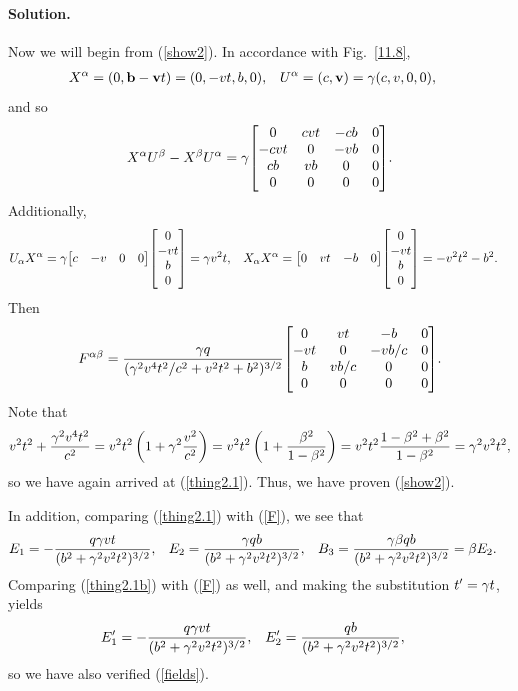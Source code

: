 \documentclass[11pt]{article}
\newcommand{\refeq}[1]{(\ref{#1})}
\newcommand{\beq}{\begin{equation*}}
\newcommand{\eeq}{\end{equation*}}
\newenvironment{solution}
{
	\paragraph{Solution.}
	\ignorespaces
}
{
    \bigskip
}
\begin{document}
\begin{solution}
	Now we will begin from \refeq{show2}.  In accordance with Fig.~\ref{11.8},
	\begin{align*}
		X^\alpha &= (0, \vb{b} - \vb{v} t) = (0, -v t, b, 0), &
		U^\alpha &= (c, \vb{v}) = \gamma (c, v, 0, 0),
	\end{align*}
	and so
	\beq
		\Xa \Ub - \Xb \Ua = \gam \mqty[	0 & c v t & - c b & 0 \\
								-c v t & 0 & -v b & 0 \\
								c b & v b & 0 & 0 \\
								0 & 0 & 0 & 0 ].
	\eeq
	Additionally,
	\begin{align*}
		\Usa \Xa &= \gam \mqty[ c & -v & 0 & 0 ] \mqty[ 0 \\ -v t \\ b \\ 0 ]
		= \gam v^2 t, &
		\Xsa \Xa &= \mqty[ 0 & vt & -b & 0 ] \mqty[ 0 \\ -v t \\ b \\ 0 ]
		= -v^2 t^2 - b^2.
	\end{align*}
	Then
	\beq
		\Fab = \frac{\gam q}{(\gam^2 v^4 t^2 / c^2 + v^2 t^2 + b^2)^{3/2}}
			\mqty[0 & v t & -b & 0 \\
				-v t & 0 & -v b / c & 0 \\
				b & v b / c & 0 & 0 \\
				0 & 0 & 0 & 0 ].
	\eeq
	Note that
	\beq
		v^2 t^2 + \frac{\gam^2 v^4 t^2}{c^2} = v^2 t^2 \left( 1 + \gam^2 \frac{v^2}{c^2} \right)
		= v^2 t^2 \left( 1 + \frac{\bet^2}{1 - \bet^2} \right)
		= v^2 t^2 \frac{1 - \bet^2 + \bet^2}{1 - \bet^2}
		= \gam^2 v^2 t^2,
	\eeq
	so we have again arrived at \refeq{thing2.1}.  Thus, we have proven \refeq{show2}.
	
	In addition, comparing \refeq{thing2.1} with \refeq{F}, we see that
	\begin{align*}
		E_1 &= -\frac{q \gamma v t}{(b^2 + \gamma^2 v^2 t^2)^{3/2}}, &
		E_2 &= \frac{\gamma q b}{(b^2 + \gamma^2 v^2 t^2)^{3/2}}, &
		B_3 &= \frac{\gamma \beta q b}{(b^2 + \gamma^2 v^2 t^2)^{3/2}} = \beta E_2.
	\end{align*}
	Comparing \refeq{thing2.1b} with \refeq{F} as well, and making the substitution $t' = \gamma t$, yields
	\begin{align*}
		E_1' &= -\frac{q \gamma v t}{(b^2 + \gamma^2 v^2 t^2)^{3/2}}, &
		E_2' &= \frac{q b}{(b^2 + \gamma^2 v^2 t^2)^{3/2}},
	\end{align*}
	so we have also verified \refeq{fields}.
\end{solution}
\end{document}
